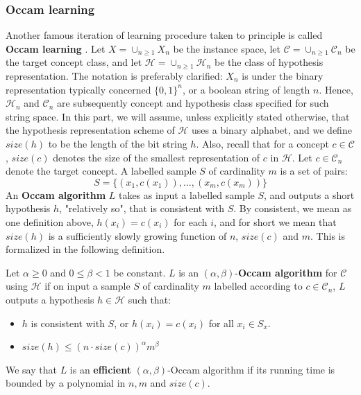 \documentclass[twoside,10pt]{article}
\begin{document}
\subsubsection{Occam learning}
Another famous iteration of learning procedure taken to principle is called \textbf{Occam learning} \cite{10.5555/200548}. Let $X= \cup_{n\geq 1} X_n$ be the instance space, let $\mathcal{C}=\cup_{n\geq 1}\mathcal{C}_{n}$ be the target concept class, and let $\mathcal{H}= \cup_{n\geq 1}\mathcal{H}_{n}$ be the class of hypothesis representation. The notation is preferably clarified: $X_{n}$ is under the binary representation typically concerned $\{0,1\}^{n}$, or a boolean string of length $n$. Hence, $\mathcal{H}_{n}$ and $\mathcal{C}_{n}$ are subsequently concept and hypothesis class specified for such string space. In this part, we will assume, unless explicitly stated otherwise, that the hypothesis representation scheme of $\mathcal{H}$ uses a binary alphabet, and we define $size(h)$ to be the length of the bit string $h$. Also, recall that for a concept $c\in \mathcal{C}$, $size(c)$ denotes the size of the smallest representation of $c$ in $\mathcal{H}$. Let $c\in \mathcal{C}_{n}$ denote the target concept. A labelled sample $S$ of cardinality $m$ is a set of pairs: 
\begin{equation*}
    S = \{(x_1, c(x_1)),\dots,(x_m, c(x_m))\}
\end{equation*}
An \textbf{Occam algorithm} $L$ takes as input a labelled sample $S$, and outputs a short hypothesis $h$, "relatively so", that is consistent with $S$. By consistent, we mean as one definition above, $h(x_{i})= c(x_{i})$ for each $i$, and for short we mean that $size(h)$ is a sufficiently slowly growing function of $n$, $size(c)$ and $m$. This is formalized in the following definition. 

\begin{definition}
    Let $\alpha \geq 0$ and $0\leq \beta < 1$ be constant. $L$ is an $(\alpha, \beta)$-\textbf{Occam algorithm} for $\mathcal{C}$ using $\mathcal{H}$ if on input a sample $S$ of cardinality $m$ labelled according to $c\in \mathcal{C}_{n}$, $L$ outputs a hypothesis $h\in \mathcal{H}$ such that: 
    \begin{itemize}
        \item $h$ is consistent with $S$, or $h(x_{i})=c(x_i)$ for all $x_{i}\in S_{x}$. 
        \item $size(h)\leq (n\cdot size(c))^{\alpha}m^{\beta}$
    \end{itemize}
    We say that $L$ is an \textbf{efficient} $(\alpha,\beta)$-Occam algorithm if its running time is bounded by a polynomial in $n,m$ and $size(c)$.  
\end{definition}
\end{document}
